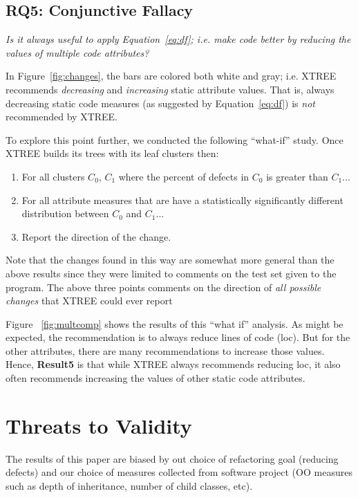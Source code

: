 \documentclass[twocolumn,5p]{elsarticle}
\newcommand{\be}{\begin{enumerate}}
\newcommand{\ee}{\end{enumerate}}
\newcommand{\fig}[1]{Figure~\ref{fig:#1}}
\newcommand{\eq}[1]{Equation~\ref{eq:#1}}
\theoremstyle{break}
\begin{document}
\begin{itemize}
		\subsection{RQ5: Conjunctive Fallacy}
		
		{\em  Is  it  always  useful  to  apply \eq{df};  i.e.   make  code  better  by  reducing  the  values  of multiple code attributes?}
		
		In  \fig{changes}, the bars are colored both white and gray; i.e. XTREE recommends {\em decreasing} and {\em increasing} 
		static attribute values. That is, always decreasing static code measures (as suggested by \eq{df}) is {\em not} recommended by XTREE.
		
		To explore this point further, we conducted the following ``what-if'' study. Once XTREE builds its trees with its leaf clusters then:
		\be
		\item For all clusters $C_0$, $C_1$ where the percent of defects in $C_0$ is greater than $C_1$...
		\item For all attribute measures that are have a statistically significantly different distribution  between $C_0$ and $C_1$...
		\item Report the direction of the change.
		\ee
		Note that the changes found in this way are somewhat more general than the above results
		since they were  limited
		to comments on the test set given to the program. The above three points comments on the direction of {\em all possible changes}
		that XTREE could ever report
		
		
		Figure ~\ref{fig:multcomp} shows the results of this ``what if'' analysis. As might be expected, the recommendation is to
		always reduce lines of code (loc). But for the other attributes, there are many recommendations to increase those values.
		Hence, {\bf Result5} is that while XTREE always  recommends reducing loc,
		it also   often recommends increasing the values of other static code attributes.   
		

		\section{Threats to Validity}\label{sect:valid}

The results of this paper are biased by out choice of refactoring goal (reducing defects) and our choice
of measures collected from software project (OO measures such as
  depth of inheritance, number of child classes, etc).
  

\end{itemize}
\end{document}
